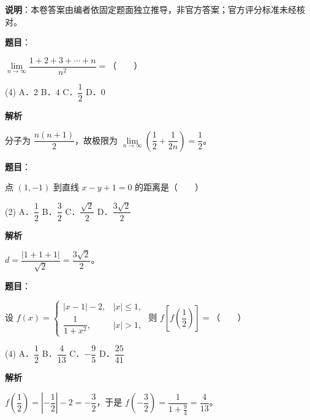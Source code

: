 
\textbf{说明}：本卷答案由编者依固定题面独立推导，非官方答案；官方评分标准未经核对。

\begin{answer}

\textbf{题目}：

$\lim\limits_{n \to \infty}\dfrac{1 + 2 + 3 + \cdots + n}{n^2} =$\mbox{（　　）}

\begin{gkopts}(4)
\task A．$2$
\task B．$4$
\task C．$\dfrac{1}{2}$
\task D．$0$
\end{gkopts}

\textbf{解析}

分子为 $\dfrac{n(n + 1)}{2}$，故极限为 $\lim\limits_{n \to \infty}\left(\dfrac{1}{2} + \dfrac{1}{2n}\right) = \dfrac{1}{2}$。


\end{answer}
\begin{answer}

\textbf{题目}：

点 $(1, -1)$ 到直线 $x - y + 1 = 0$ 的距离是\mbox{（　　）}

\begin{gkopts}(2)
\task A．$\dfrac{1}{2}$
\task B．$\dfrac{3}{2}$
\task C．$\dfrac{\sqrt{2}}{2}$
\task D．$\dfrac{3\sqrt{2}}{2}$
\end{gkopts}

\textbf{解析}

$d = \dfrac{|1 + 1 + 1|}{\sqrt{2}} = \dfrac{3\sqrt{2}}{2}$。


\end{answer}
\begin{answer}

\textbf{题目}：

设 $f(x) = \begin{cases}|x - 1| - 2, & |x| \leqslant 1,\\ \dfrac{1}{1 + x^2}, & |x| > 1,\end{cases}$ 则 $f\left[f\left(\dfrac{1}{2}\right)\right] =$\mbox{（　　）}

\begin{gkopts}(4)
\task A．$\dfrac{1}{2}$
\task B．$\dfrac{4}{13}$
\task C．$-\dfrac{9}{5}$
\task D．$\dfrac{25}{41}$
\end{gkopts}

\textbf{解析}

$f\left(\dfrac{1}{2}\right) = \left|-\dfrac{1}{2}\right| - 2 = -\dfrac{3}{2}$，于是 $f\left(-\dfrac{3}{2}\right) = \dfrac{1}{1 + \frac{9}{4}} = \dfrac{4}{13}$。


\end{answer}
